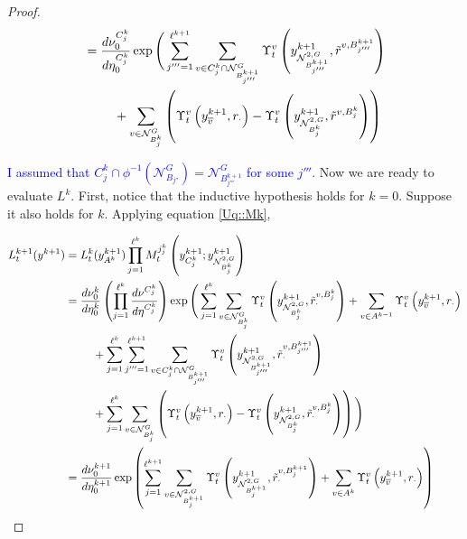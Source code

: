 \documentclass[12pt]{article}
\newcommand{\mc}{\mathcal}
\newcommand{\ov}{\overline}
\newcommand{\tb}{\textcolor{blue}}
\newcommand{\gneigh}[2]{\mc{N}^{#1}_{#2}}			%
\newcommand{\dgneigh}[2]{\mc{N}^{2,#1}_{#2}}		%
\newcommand{\cl}[1]{\ov{#1}}						%
\newcommand{\indx}[1]{^{#1}}						%
\newcommand{\rate}{r}								%
\newcommand{\xg}{y}									%
\newcommand{\vind}[1]{_{#1}}						%
\newcommand{\vpara}[1]{^{#1}}						%
\newcommand{\stpara}[1]{_{#1}}						%
\newcommand{\tpara}[1]{_{#1}}						%
\newcommand{\psize}{\ell}							%
\newcommand{\brate}{\alt{\rate}}					%
\newcommand{\alt}[1]{\tilde{#1}}					%
\newcommand{\mm}{\nu}								%
\newcommand{\mmm}{\eta}								%
\newcommand{\ds}{\Upsilon}							%
\newcommand{\dense}{L}								%
\newcommand{\mdense}{M}								%
\newcommand{\jpara}[1]{^{#1}}						%
\newcommand{\vjpara}[2]{^{#1,#2}}					%
\begin{document}
\begin{proof}
\begin{align}
&= \frac{d\mm\vpara{C\indx{k}_j}\tpara{0}}{d\mmm\vpara{C\indx{k}_j}\tpara{0}}\exp\Bigg(\sum_{j''' = 1}^{\psize\indx{k+1}} \sum_{v \in C\indx{k}_{j}\cap\gneigh{G}{B\indx{k+1}_{j'''}}} \ds\vpara{v}\tpara{t}\left(\xg\indx{k+1}\vind{\dgneigh{G}{B\indx{k+1}_{j'''}}},\brate\vjpara{v}{B\indx{k+1}_{j'''}}\right)\nonumber\\
&\hspace{24 pt} + \sum_{v \in \gneigh{G}{B\indx{k}_{j}}}\left(\ds\vpara{v}\tpara{t}\left(\xg\indx{k+1}\vind{\cl{v}},\rate\stpara{\cdot}\right) - \ds\vpara{v}\tpara{t}\left(\xg\indx{k+1}\vind{\dgneigh{G}{B\indx{k}_{j}}},\brate\vjpara{v}{B\indx{k}_{j}}\right)\right)
\label{Uq::Mk}
\end{align}

\tb{I assumed that \(C_j\indx{k}\cap\phi^{-1}(\gneigh{G}{B_{j''}}) = \gneigh{G}{B_{j'''}\indx{k+1}}\) for some \(j'''\). }Now we are ready to evaluate \(\dense\indx{k}\). First, notice that the inductive hypothesis holds for \(k=0\). Suppose it also holds for \(k\). Applying equation \eqref{Uq::Mk},

\begin{align*}
\dense\indx{k+1}\tpara{t}(\xg\indx{k+1}) &= \dense\indx{k}\tpara{t}(\xg\indx{k+1}\vind{A\indx{k}})\prod_{j=1}^{\psize\indx{k}}\mdense\jpara{j\indx{k}_j}\tpara{t}\left(\xg\indx{k+1}\vind{C_j\indx{k}};\xg\indx{k+1}\vind{\dgneigh{G}{B\indx{k}_j}}\right)\\
&= \frac{d\mm\indx{k}\tpara{0}}{d\mmm\indx{k}\tpara{0}}\left(\prod_{j=1}^{\psize\indx{k}}\frac{d\mm\vpara{C_j\indx{k}}}{d\mmm\vpara{C_j\indx{k}}}\right)\exp\Bigg(\sum_{j=1}^{\psize\indx{k}}\sum_{v\in \gneigh{G}{B_j\indx{k}}} \ds\vpara{v}\tpara{t}\left(\xg\indx{k+1}\vind{\dgneigh{G}{B\indx{k}_j}},\brate\vjpara{v}{B\indx{k}_j}\stpara{\cdot}\right) + \sum_{v \in A\indx{k-1}} \ds\vpara{v}\tpara{t}\left(\xg\indx{k+1}\vind{\cl{v}},\rate\stpara{\cdot}\right)\\
&\hspace{24 pt} + \sum_{j=1}^{\psize\indx{k}}\sum_{j'''=1}^{\psize\indx{k+1}}\sum_{v \in C_j\indx{k}\cap\gneigh{G}{B_{j'''}\indx{k+1}}}\ds\vpara{v}\tpara{t}\left(\xg\indx{k+1}\vind{\dgneigh{G}{B_{j'''}\indx{k+1}}},\brate\vjpara{v}{B\indx{k+1}_{j'''}}\stpara{\cdot}\right)\\
&\hspace{24pt} + \sum_{j=1}^{\psize\indx{k}}\sum_{v \in \gneigh{G}{B_j\indx{k}}}\left(\ds\vpara{v}\tpara{t}\left(\xg\indx{k+1}\vind{\cl{v}},\rate\stpara{\cdot}\right) - \ds\vpara{v}\tpara{t}\left(\xg\indx{k+1}\vind{\dgneigh{G}{B_j\indx{k}}},\brate\vjpara{v}{B\indx{k}_j}\stpara{\cdot}\right)\right)\Bigg)\\
&= \frac{d\mm\indx{k+1}\tpara{0}}{d\mmm\indx{k+1}\tpara{0}}\exp\left(\sum_{j=1}^{\psize\indx{k+1}}\sum_{v\in \dgneigh{G}{B_j\indx{k+1}}} \ds\vpara{v}\tpara{t}\left(\xg\indx{k+1}\vind{\dgneigh{G}{B\indx{k+1}_j}},\brate\vjpara{v}{B\indx{k+1}_j}\stpara{\cdot}\right) + \sum_{v \in A\indx{k}}\ds\vpara{v}\tpara{t}\left(\xg\vind{\cl{v}}\indx{k+1},\rate\stpara{\cdot}\right)\right)
\end{align*}


\end{proof}
\end{document}
